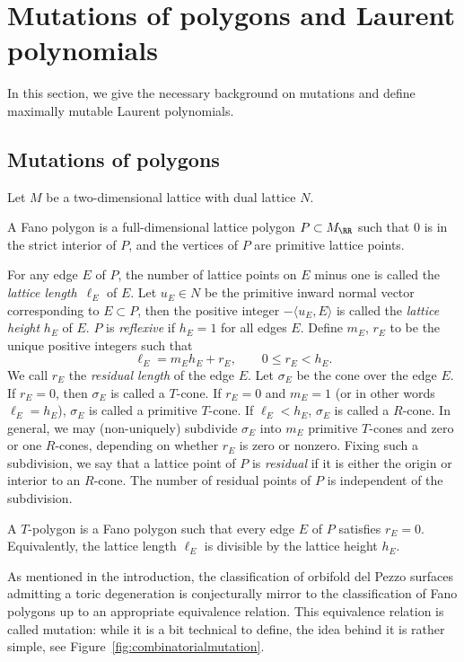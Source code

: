 \section{Mutations of polygons and Laurent polynomials}\label{sec:combinatorics}
In this section, we give the necessary background on mutations and define maximally mutable Laurent polynomials.
	\subsection{Mutations of polygons}\label{sec:mutationsofpolygons}
Let $M$ be a two-dimensional lattice with dual lattice $N$.
	\begin{Definition}\label{def:Fanopolygon}
		A Fano polygon is a full-dimensional lattice polygon $P \subset M_\RR$ such that $0$ is in the strict interior of $P$, and the vertices of $P$ are primitive lattice points.
	\end{Definition}
For any edge $E$ of $P$, the number of lattice points on $E$ minus one is called the \emph{lattice length}~$\ell_E$ of $E$. Let $u_E \in N$ be the primitive inward normal vector corresponding to $E \subset P$, then the positive integer $-\langle u_E, E \rangle$ is called the \emph{lattice height} $h_E$ of $E$.
$P$ is \emph{reflexive} if $h_E= 1$ for all edges $E$. Define $m_E$, $r_E$ to be the unique positive integers such that
\[
\ell_E=m_Eh_E+r_E, \qquad 0 \leq r_E<h_E.
\]
We call $r_E$ the \emph{residual length} of the edge $E$. Let $\sigma_E$ be the cone over the edge $E$.
If $r_E=0$, then $\sigma_E$ is called a $T$-cone. If $r_E=0$ and $m_E=1$ (or in other words $\ell_E=h_E$), $\sigma_E$ is called a primitive $T$-cone. If $\ell_E<h_E$, $\sigma_E$ is called a $R$-cone.
In general, we may (non-uniquely) subdivide $\sigma_E$ into $m_E$ primitive $T$-cones and zero or one $R$-cones, depending on whether $r_E$ is zero or nonzero.
Fixing such a subdivision, we say that a lattice point of $P$ is \emph{residual} if it is either the origin or interior to an $R$-cone. The number of residual points of $P$ is independent of the subdivision.
	\begin{Definition}
	A $T$-polygon is a Fano polygon such that every edge $E$ of $P$ satisfies $r_E=0$. Equivalently, the lattice length $\ell_E$ is divisible by the lattice height $h_E$.
\end{Definition}
As mentioned in the introduction, the classification of orbifold del Pezzo surfaces admitting a toric degeneration is conjecturally mirror to the classification of Fano polygons up to an appropriate equivalence relation. This equivalence relation is called mutation: while it is a bit technical to define, the idea behind it is rather simple, see Figure~\ref{fig:combinatorialmutation}.
